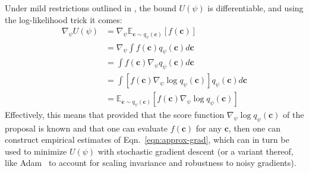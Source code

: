 \documentclass[twocolumn,superscriptaddress,aps]{revtex4-1}
\theoremstyle{plain}
\begin{document}
Under mild restrictions outlined in  \citep{2012arXiv1212.4507S}, the bound $U(\psi)$ is differentiable, and using the log-likelihood trick it comes:
\begin{align}\label{eqn:approx-grad}
    \nabla_\psi U(\psi) &= \nabla_\psi \mathbb{E}_{\mathbf{c} \sim q_\psi(\mathbf{c})} [f(\mathbf{c})] \nonumber \\
    &= \nabla_\psi \int f(\mathbf{c})  q_\psi(\mathbf{c})  d\mathbf{c} \nonumber \\
    &= \int f(\mathbf{c}) \nabla_\psi q_\psi(\mathbf{c})  d\mathbf{c} \nonumber \\
    &= \int \left[ f(\mathbf{c}) \nabla_\psi \log q_\psi(\mathbf{c}) \right]  q_\psi(\mathbf{c})  d\mathbf{c} \nonumber \\
    &= \mathbb{E}_{\mathbf{c} \sim q_\psi(\mathbf{c})} [f(\mathbf{c}) \nabla_\psi \log q_\psi(\mathbf{c})]
\end{align}
Effectively, this means that provided that the score function $\nabla_\psi \log q_\psi(\mathbf{c})$ of the proposal
is known and that one can evaluate $f(\mathbf{\mathbf{c}})$ for any $\mathbf{c}$, then
one can construct empirical estimates of Eqn.~\ref{eqn:approx-grad}, which can
in turn be used to minimize $U(\psi)$ with stochastic gradient descent (or a variant thereof, like Adam~\cite{2014arXiv1412.6980K} to account for scaling invariance and robustness to noisy gradients).

\end{document}
